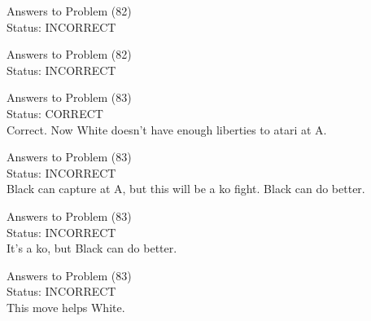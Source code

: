 \documentclass[11pt]{article}
\begin{document}
\begin{minipage}[t]{0.5\textwidth}
  {\centering
  
  Answers to Problem (82)\\
  Status: INCORRECT\\
  
  }
\end{minipage}
\begin{minipage}[t]{0.5\textwidth}
  {\centering
  
  Answers to Problem (82)\\
  Status: INCORRECT\\
  
  }
\end{minipage}
\begin{minipage}[t]{0.5\textwidth}
  {\centering
  
  Answers to Problem (83)\\
  Status: CORRECT\\
  Correct. Now White doesn't have enough liberties to atari at A.\\
  }
\end{minipage}
\begin{minipage}[t]{0.5\textwidth}
  {\centering
  
  Answers to Problem (83)\\
  Status: INCORRECT\\
  Black can capture at A, but this will be a ko fight. Black can do better.\\
  }
\end{minipage}
\begin{minipage}[t]{0.5\textwidth}
  {\centering
  
  Answers to Problem (83)\\
  Status: INCORRECT\\
  It's a ko, but Black can do better.\\
  }
\end{minipage}
\begin{minipage}[t]{0.5\textwidth}
  {\centering
  
  Answers to Problem (83)\\
  Status: INCORRECT\\
  This move helps White.\\
  }
\end{minipage}
\end{document}
